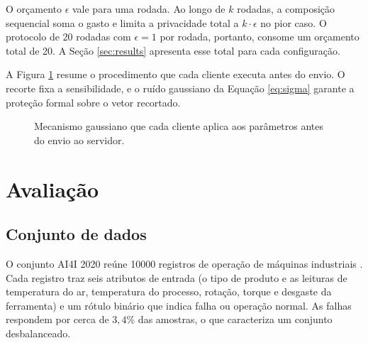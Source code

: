 \documentclass[12pt]{article}
\begin{document}
O orçamento $\epsilon$ vale para uma rodada. Ao longo de $k$ rodadas, a composição
sequencial soma o gasto e limita a privacidade total a $k\cdot\epsilon$ no pior caso.
O protocolo de 20 rodadas com $\epsilon=1$ por rodada, portanto, consome um orçamento
total de 20. A Seção \ref{sec:results} apresenta esse total para cada configuração.

A Figura \ref{alg:dp} resume o procedimento que cada cliente executa antes do envio.
O recorte fixa a sensibilidade, e o ruído gaussiano da Equação \ref{eq:sigma}
garante a proteção formal sobre o vetor recortado.

\begin{figure}[H]
\centering
{}
\caption{Mecanismo gaussiano que cada cliente aplica aos parâmetros antes do envio ao servidor.}
\label{alg:dp}
\end{figure}

\section{Avaliação} \label{sec:aval}

\subsection{Conjunto de dados}

O conjunto AI4I 2020 reúne 10000 registros de operação de máquinas industriais \cite{matzka2020explainable}. Cada registro traz seis atributos de entrada (o tipo de produto e as leituras de temperatura do ar, temperatura do processo, rotação, torque e desgaste da ferramenta) e um rótulo binário que indica falha ou operação normal. As falhas respondem por cerca de $3{,}4\%$ das amostras, o que caracteriza um conjunto desbalanceado.
\end{document}
